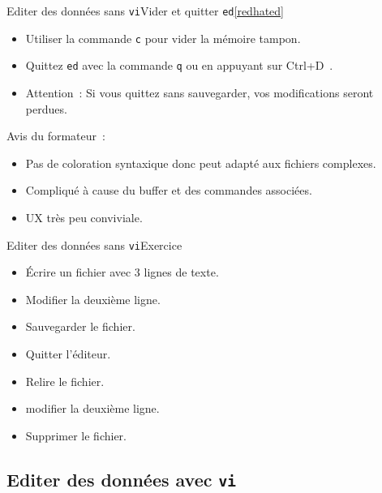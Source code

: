 \documentclass{beamer}
\begin{document}
    \begin{frame}{Editer des données sans \lstinline{vi}}{Vider et quitter \lstinline{ed}\cref{redhated}}
        \begin{itemize}
            \item Utiliser la commande \lstinline{c} pour vider la mémoire tampon.
            \item Quittez \lstinline{ed} avec la commande \lstinline{q} ou en appuyant sur Ctrl+D~.
            \item Attention~: Si vous quittez sans sauvegarder, vos modifications seront perdues.
        \end{itemize}
        \begin{dangercolorbox}
            Avis du formateur~:
            \begin{itemize}
                \item Pas de coloration syntaxique donc peut adapté aux fichiers complexes.
                \item Compliqué à cause du buffer et des commandes associées.
                \item UX très peu conviviale.
            \end{itemize}
        \end{dangercolorbox}
    \end{frame}

    \begin{frame}{Editer des données sans \lstinline{vi}}{Exercice \execcounterdispinc}
        \begin{itemize}
            \item Écrire un fichier avec 3 lignes de texte.
            \item Modifier la deuxième ligne.
            \item Sauvegarder le fichier.
            \item Quitter l'éditeur.
            \item Relire le fichier.
            \item modifier la deuxième ligne.
            \item Supprimer le fichier.
        \end{itemize}
    \end{frame}

    \subsection{Editer des données avec \lstinline{vi}}\label{subsec:edit-whith-vi}
\end{document}
